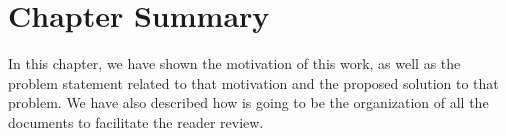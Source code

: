 \section{Chapter Summary}
In this chapter, we have shown the motivation of this work, as well as the problem statement related to that motivation and the proposed solution to that problem.
We have also described how is going to be the organization of all the documents to facilitate the reader review.
